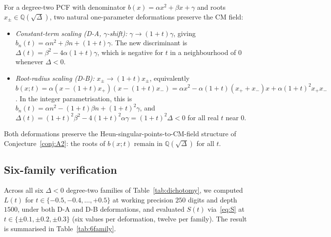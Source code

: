 \documentclass[11pt,reqno]{amsart}
\theoremstyle{definition}
\begin{document}
For a degree-two PCF with denominator
$b(x) = \alpha x^{2} + \beta x + \gamma$ and roots
$x_{\pm}\in\mathbb{Q}(\sqrt{\Delta})$, two natural one-parameter
deformations preserve the CM field:
\begin{itemize}
\item \emph{Constant-term scaling (D-A, $\gamma$-shift):}
$\gamma \to (1+t)\gamma$, giving
$b_{n}(t) = \alpha n^{2} + \beta n + (1+t)\gamma$. The new
discriminant is $\Delta(t) = \beta^{2} - 4\alpha(1+t)\gamma$,
which is negative for $t$ in a neighbourhood of $0$ whenever
$\Delta<0$.
\item \emph{Root-radius scaling (D-B):}
$x_{\pm}\to (1+t)x_{\pm}$, equivalently
$b(x;t) = \alpha(x-(1+t)x_{+})(x-(1+t)x_{-})
= \alpha x^{2} - \alpha(1+t)(x_{+}+x_{-})x + \alpha(1+t)^{2}x_{+}x_{-}$.
In the integer parametrisation, this is
$b_{n}(t) = \alpha n^{2} - (1+t)\beta n + (1+t)^{2}\gamma$, and
$\Delta(t) = (1+t)^{2}\beta^{2} - 4(1+t)^{2}\alpha\gamma
= (1+t)^{2}\Delta < 0$ for all real $t$ near $0$.
\end{itemize}
Both deformations preserve the Heun-singular-points-to-CM-field
structure of Conjecture~\ref{conj:A2}: the roots of $b(x;t)$
remain in $\mathbb{Q}(\sqrt{\Delta})$ for all $t$.

\subsection{Six-family verification}\label{ssec:6family}

Across all six $\Delta<0$ degree-two families of
Table~\ref{tab:dichotomy}, we computed $L(t)$ for
$t\in\{-0.5,-0.4,\ldots,+0.5\}$ at working precision $250$
digits and depth $1500$, under both D-A and D-B deformations,
and evaluated $S(t)$ via~\eqref{eq:S} at
$t\in\{\pm 0.1,\pm 0.2,\pm 0.3\}$ (six values per
deformation, twelve per family). The result is summarised in
Table~\ref{tab:6family}.
\end{document}
